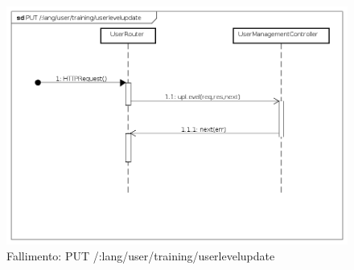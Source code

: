 \begin{itemize}
\begin{figure}[ht]
	\centering
	\includegraphics[scale=0.45]{UML/DiagrammiDiSequenza/Back-end/PUT__lang_user_training_userlevelupdate_failure.png}
	\caption{Fallimento: PUT /:lang/user/training/userlevelupdate}
\end{figure}
\FloatBarrier

\end{itemize} 